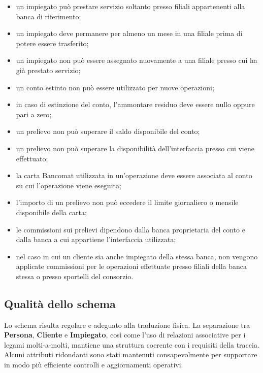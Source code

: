 \begin{itemize}
  \item un impiegato può prestare servizio soltanto presso filiali appartenenti alla banca di riferimento;
  \item un impiegato deve permanere per almeno un mese in una filiale prima di potere essere trasferito;
  \item un impiegato non può essere assegnato nuovamente a una filiale presso cui ha già prestato servizio;
  \item un conto estinto non può essere utilizzato per nuove operazioni;
  \item in caso di estinzione del conto, l'ammontare residuo deve essere nullo oppure pari a zero;
  \item un prelievo non può superare il saldo disponibile del conto;
  \item un prelievo non può superare la disponibilità dell'interfaccia presso cui viene effettuato;
  \item la carta Bancomat utilizzata in un'operazione deve essere associata al conto su cui l'operazione viene eseguita;
  \item l'importo di un prelievo non può eccedere il limite giornaliero o mensile disponibile della carta;
  \item le commissioni sui prelievi dipendono dalla banca proprietaria del conto e dalla banca a cui appartiene l'interfaccia utilizzata;
  \item nel caso in cui un cliente sia anche impiegato della stessa banca, non vengono applicate commissioni per le operazioni effettuate presso filiali della banca stessa o presso sportelli del consorzio.
\end{itemize}

\subsection{Qualità dello schema}
Lo schema risulta regolare e adeguato alla traduzione fisica. La separazione tra \textbf{Persona}, \textbf{Cliente} e \textbf{Impiegato}, così come l'uso di relazioni associative per i legami molti-a-molti, mantiene una struttura coerente con i requisiti della traccia. Alcuni attributi ridondanti sono stati mantenuti consapevolmente per supportare in modo più efficiente controlli e aggiornamenti operativi.
